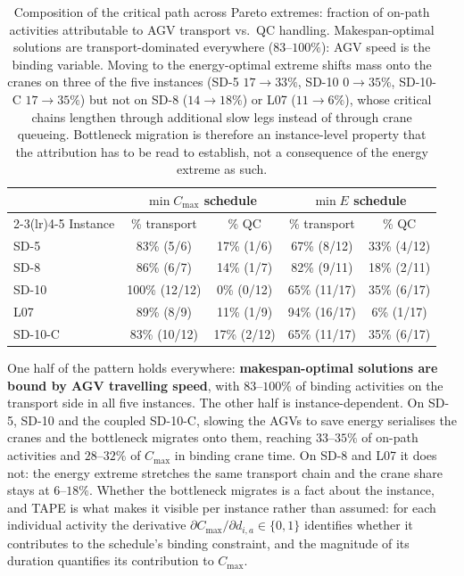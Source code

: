 \documentclass[11pt]{article}
\begin{document}
\begin{table}[t]
\centering\small
\caption{Composition of the critical path across Pareto extremes: fraction of on-path
activities attributable to AGV transport vs.\ QC handling. Makespan-optimal solutions are
transport-dominated everywhere ($83$--$100\%$): AGV speed is the binding variable. Moving
to the energy-optimal extreme shifts mass onto the cranes on three of the five instances
(\textsf{SD-5} $17\!\to\!33\%$, \textsf{SD-10} $0\!\to\!35\%$, \textsf{SD-10-C}
$17\!\to\!35\%$) but not on \textsf{SD-8} ($14\!\to\!18\%$) or \textsf{L07}
($11\!\to\!6\%$), whose critical chains lengthen through additional slow legs instead of
through crane queueing. Bottleneck migration is therefore an instance-level property that
the attribution has to be read to establish, not a consequence of the energy extreme
as such.}
\label{tab:critpath_summary}
\setlength{\tabcolsep}{5pt}
\begin{tabular}{lcccc}
\toprule
& \multicolumn{2}{c}{$\min C_{\max}$ schedule} & \multicolumn{2}{c}{$\min E$ schedule} \\
\cmidrule(lr){2-3}\cmidrule(lr){4-5}
Instance & \% transport & \% QC & \% transport & \% QC \\
\midrule
SD-5  & 83\% (5/6) & 17\% (1/6) & 67\% (8/12) & 33\% (4/12) \\
SD-8  & 86\% (6/7) & 14\% (1/7) & 82\% (9/11) & 18\% (2/11) \\
SD-10 & 100\% (12/12) & 0\% (0/12) & 65\% (11/17) & 35\% (6/17) \\
L07   & 89\% (8/9) & 11\% (1/9) & 94\% (16/17) & 6\% (1/17) \\
\midrule
SD-10-C & 83\% (10/12) & 17\% (2/12) & 65\% (11/17) & 35\% (6/17) \\
\bottomrule
\end{tabular}
\end{table}

One half of the pattern holds everywhere: \textbf{makespan-optimal solutions are bound by
AGV travelling speed}, with $83$--$100\%$ of binding activities on the transport side in
all five instances. The other half is instance-dependent. On \textsf{SD-5}, \textsf{SD-10}
and the coupled \textsf{SD-10-C}, slowing the AGVs to save energy serialises the cranes and
the bottleneck migrates onto them, reaching $33$--$35\%$ of on-path activities and
$28$--$32\%$ of $C_{\max}$ in binding crane time. On \textsf{SD-8} and \textsf{L07} it does
not: the energy extreme stretches the same transport chain and the crane share stays at
$6$--$18\%$. Whether the bottleneck migrates is a fact about the instance, and TAPE is what
makes it visible per instance rather than assumed: for each individual activity the
derivative $\partial C_{\max}/\partial d_{i,a}\in\{0,1\}$ identifies whether it
contributes to the schedule's binding constraint, and the magnitude of its duration
quantifies its contribution to $C_{\max}$.
\end{document}
